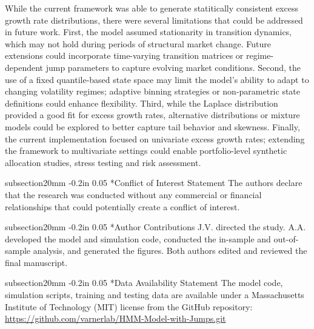 \documentclass[12pt, letterpaper]{article}
\makeatletter
\renewcommand\section{\@startsection
	{subsection}{2}{0mm}
	{-0.2in}
	{0.05\baselineskip}
	{\normalfont\large\bfseries}}
\makeatother
\begin{document}
While the current framework was able to generate statitically consistent excess growth rate distributions, there were several limitations that could be addressed in future work. First, the model assumed stationarity in transition dynamics, which may not hold during periods of structural market change. Future extensions could incorporate time-varying transition matrices or regime-dependent jump parameters to capture evolving market conditions. Second, the use of a fixed quantile-based state space may limit the model's ability to adapt to changing volatility regimes; adaptive binning strategies or non-parametric state definitions could enhance flexibility. Third, while the Laplace distribution provided a good fit for excess growth rates, alternative distributions or mixture models could be explored to better capture tail behavior and skewness. Finally, the current implementation focused on univariate excess growth rates; extending the framework to multivariate settings could enable portfolio-level synthetic allocation studies, stress testing and risk assessment.

\clearpage

\section*{Conflict of Interest Statement}
The authors declare that the research was conducted without any commercial or financial relationships that could potentially create a conflict of interest.

\section*{Author Contributions}
J.V. directed the study. A.A. developed the model and simulation code, conducted the in-sample and out-of-sample analysis, and generated the figures. Both authors edited and reviewed the final manuscript.

\section*{Data Availability Statement}
The model code, simulation scripts, training and testing data are available under a Massachusetts Institute of Technology (MIT) license from the GitHub repository: \url{https://github.com/varnerlab/HMM-Model-with-Jumps.git}

\newpage



\newpage
\appendix
\end{document}
